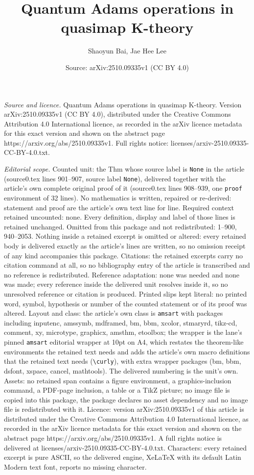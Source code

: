 \documentclass[10pt,a4paper]{amsart}
\title[Quantum Adams operations in quasimap K-theory]{Quantum Adams operations in quasimap K-theory}
\author{Shaoyun Bai, Jae Hee Lee}
\date{Source: arXiv:2510.09335v1 (CC BY 4.0)}
\begin{document}
\maketitle

\noindent\emph{Source and licence.} Quantum Adams operations in quasimap K-theory. Version arXiv:2510.09335v1 (CC BY 4.0), distributed under the Creative Commons Attribution 4.0 International licence, as recorded in the arXiv licence metadata for this exact version and shown on the abstract page https://arxiv.org/abs/2510.09335v1. Full rights notice: licenses/arxiv-2510.09335-CC-BY-4.0.txt.\par\smallskip

\noindent\textit{Editorial scope.} Counted unit: the Thm whose source label is \texttt{None} in the article (source0.tex lines 901--907, source label \texttt{None}), delivered together with the article's own complete original proof of it (source0.tex lines 908--939, one \texttt{proof} environment of 32 lines). No mathematics is written, repaired or re-derived: statement and proof are the article's own text line for line. Required context retained uncounted: none. Every definition, display and label of those lines is retained unchanged. Omitted from this package and not redistributed: 1--900, 940--2053. Nothing inside a retained excerpt is omitted or altered: every retained body is delivered exactly as the article's lines are written, so no omission receipt of any kind accompanies this package. Citations: the retained excerpts carry no citation command at all, so no bibliography entry of the article is transcribed and no reference is redistributed. Reference adaptation: none was needed and none was made; every reference inside the delivered unit resolves inside it, so no unresolved reference or citation is produced. Printed slips kept literal: no printed word, symbol, hypothesis or number of the counted statement or of its proof was altered. Layout and class: the article's own class is \texttt{amsart} with packages including inputenc, amssymb, mdframed, bm, bbm, xcolor, stmaryrd, tikz-cd, comment, xy, microtype, graphicx, amsthm, etoolbox; the wrapper is the lane's pinned \texttt{amsart} editorial wrapper at 10pt on A4, which restates the theorem-like environments the retained text needs and adds the article's own macro definitions that the retained text needs (\texttt{\textbackslash curly}), with extra wrapper packages (bm, bbm, dsfont, xspace, cancel, mathtools). The delivered numbering is the unit's own. Assets: no retained span contains a figure environment, a graphics-inclusion command, a PDF-page inclusion, a table or a TikZ picture; no image file is copied into this package, the package declares no asset dependency and no image file is redistributed with it. Licence: version arXiv:2510.09335v1 of this article is distributed under the Creative Commons Attribution 4.0 International licence, as recorded in the arXiv licence metadata for this exact version and shown on the abstract page https://arxiv.org/abs/2510.09335v1. A full rights notice is delivered at licenses/arxiv-2510.09335-CC-BY-4.0.txt. Characters: every retained excerpt is pure ASCII, so the delivered engine, XeLaTeX with its default Latin Modern text font, reports no missing character.
\end{document}

